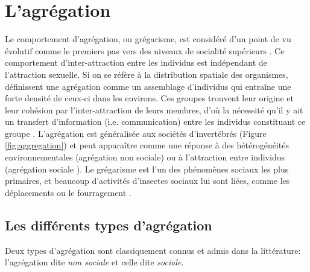 \section{L'agrégation}
\label{sec:agregation}
Le comportement d'agrégation, ou grégarisme, est considéré d'un point de vu évolutif comme le premiers pas vers des niveaux de socialité supérieurs \citep{campan_ethologie._2002, aron_les_2009}. Ce comportement d'inter-attraction entre les individus est indépendant de l'attraction sexuelle. Si on se réfère à la distribution spatiale des organismes, \citet{camazine_self-organization_2001} définissent une agrégation comme un assemblage d'individus qui entraîne une forte densité de ceux-ci dans les environs. Ces groupes trouvent leur origine et leur cohésion par l'inter-attraction de leurs membres, d'où la nécessité qu'il y ait un transfert d'information (i.e. communication) entre les individus constituant ce groupe \citep{camazine_self-organization_2001, ame_collegial_2006}. L'agrégation est généralisée aux sociétés d'invertébrés (Figure \ref{fig:aggregation}) et peut apparaître comme une réponse à des hétérogénéités environnementales (agrégation non sociale) ou à l'attraction entre individus (agrégation sociale \cite{costa_other_2006}). Le grégarisme est l'un des phénomènes sociaux les plus primaires, et beaucoup d'activités d'insectes sociaux lui sont liées, comme les déplacements ou le fourragement \citep{deneubourg_dynamics_2002, simpson_gregarious_2001, wertheim_effects_2006}.



    \subsection{Les différents types d'agrégation}
    \label{subsec:types}
Deux types d'agrégation sont classiquement connus et admis dans la littérature: l'agrégation dite \textit{non sociale} et celle dite \textit{sociale}.

